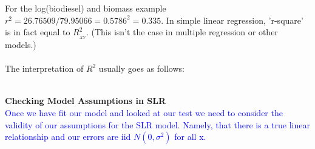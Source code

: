 For the log(biodiesel) and biomass example $r^2=26.76509/79.95066=0.5786^2= 0.335$.  In simple linear regression, 'r-square' is in fact equal to $R_{_{XY}}^2$.  (This isn't the case in multiple regression or other models.)\\~\\

The interpretation of $R^2$ usually goes as follows:\\~\\


\newpage



\Large \textbf{Checking Model Assumptions in SLR}\large\\

\textcolor{blue}{Once we have fit our model and looked at our test we need to consider the validity of our assumptions for the SLR model.  Namely, that there is a true linear relationship and our errors are iid $N(0,\sigma^2)$ for all x.}\\~\\

